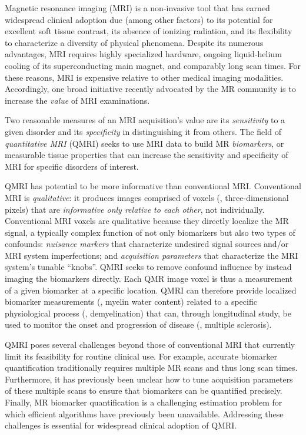 
Magnetic resonance imaging (MRI)
is a non-invasive tool
that has earned widespread clinical adoption
due (among other factors) 
to its potential for excellent soft tissue contrast,
its absence of ionizing radiation,
and its flexibility to characterize 
a diversity of physical phenomena. 
Despite its numerous advantages,
MRI requires highly specialized hardware,
ongoing liquid-helium cooling
of its superconducting main magnet,
and comparably long scan times.
For these reasons,
MRI is expensive relative
to other medical imaging modalities.
Accordingly,
one broad initiative 
recently advocated by the MR community 
is to increase the \emph{value}
of MRI examinations.

Two reasonable measures
of an MRI acquisition's value
are its \emph{sensitivity}
to a given disorder
and its \emph{specificity}
in distinguishing it
from others.
The field of \emph{quantitative MRI} (QMRI)
seeks to use MRI data 
to build MR \emph{biomarkers},
or measurable tissue properties
that can increase the sensitivity and specificity of MRI
for specific disorders of interest.

QMRI has potential
to be more informative than conventional MRI.
Conventional MRI is \emph{qualitative}:
it produces images comprised of voxels
(\ie, three-dimensional pixels)
that are \emph{informative only relative to each other},
not individually.
Conventional MRI voxels are qualitative
because they directly localize the MR signal,
a typically complex function
of not only biomarkers
but also two types of confounds:
\emph{nuisance markers}
that characterize undesired signal sources
and/or MRI system imperfections;
and \emph{acquisition parameters}
that characterize the MRI system's tunable ``knobs''. 
QMRI seeks to remove confound influence
by instead imaging the biomarkers directly.
Each QMR image voxel
is thus a measurement 
of a given biomarker
at a specific location.
QMRI can therefore provide localized biomarker measurements
(\eg, myelin water content)
related to a specific physiological process
(\eg, demyelination)
that can, through longitudinal study,
be used to monitor the onset and progression of disease
(\eg, multiple sclerosis).

QMRI poses several challenges
beyond those of conventional MRI 
that currently limit its feasibility 
for routine clinical use.
For example,
accurate biomarker quantification 
traditionally requires multiple MR scans
and thus long scan times.
Furthermore,
it has previously been unclear
how to tune acquisition parameters 
of these multiple scans
to ensure that biomarkers can be quantified precisely.
Finally, MR biomarker quantification
is a challenging estimation problem
for which efficient algorithms
have previously been unavailable.
Addressing these challenges is essential
for widespread clinical adoption of QMRI.


